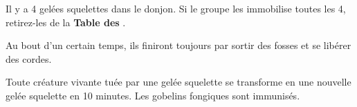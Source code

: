 Il y a 4 gelées squelettes dans le donjon. 
Si le groupe les immobilise toutes les 4, retirez-les de la \textbf{Table des }. 

Au bout d’un certain temps, ils finiront toujours par sortir des fosses et se libérer des cordes. 

Toute créature vivante tuée par une gelée squelette se transforme en une nouvelle gelée squelette en 10 minutes. 
Les gobelins fongiques sont immunisés.